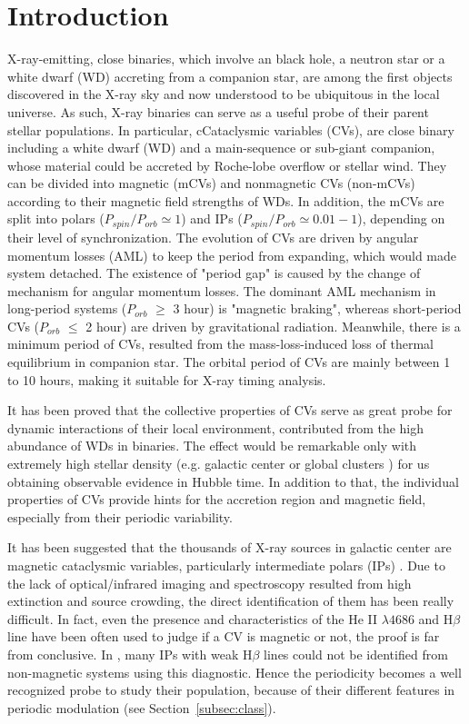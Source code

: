\documentclass[fleqn,usenatbib]{mnras}
\begin{document}
\section{Introduction} \label{sec:intro}
X-ray-emitting, close binaries, which involve an black hole, a neutron star or a white dwarf (WD) accreting from a companion star, are among the first objects discovered in the X-ray sky and now understood to be ubiquitous in the local universe. As such, X-ray binaries can serve as a useful probe of their parent stellar populations.
In particular, cCataclysmic variables (CVs), are close binary including a white dwarf (WD) and a main-sequence or sub-giant companion, whose material could be accreted by Roche-lobe overflow or stellar wind. 
They can be divided into magnetic (mCVs) and nonmagnetic CVs (non-mCVs) according to their magnetic field strengths of WDs. In addition, the mCVs are split into polars ($P_{spin}/P_{orb}\simeq 1$) and IPs ($P_{spin}/P_{orb}\simeq 0.01-1$), depending on their level of synchronization. 
The evolution of CVs are driven by angular momentum losses (AML) to keep the period from expanding, which would made system detached. The existence of  "period gap" is caused by the change of mechanism for angular momentum losses.  The dominant AML mechanism in long-period
systems ($P_{orb}$ $\geq$ 3 hour) is "magnetic braking", whereas short-period CVs ($P_{orb}$ $\leq$ 2 hour) are  driven by gravitational radiation. Meanwhile, there is a minimum period of CVs, resulted from the mass-loss-induced loss of thermal equilibrium in companion star. The orbital period of CVs are mainly between 1 to 10 hours, making it suitable for X-ray timing analysis. 

It has been proved that the collective properties of CVs serve as great probe for dynamic interactions of their local environment, contributed from the high abundance of WDs in binaries. The effect would be remarkable only with extremely high stellar density (e.g. galactic center or global clusters \citep{2019ApJ...876...59C}) for us obtaining observable evidence in Hubble time. 
In addition to that, the individual properties of CVs provide hints for the accretion region and magnetic field, especially from their periodic variability.

It has been suggested that the thousands of X-ray sources in galactic center are magnetic cataclysmic variables, particularly intermediate
polars (IPs) \citep{2009ApJS..181..110M,2018ApJS..235...26Z}. Due to the lack of optical/infrared imaging and spectroscopy resulted from high extinction and source crowding, the direct identification of them has been really difficult.
In fact, even the presence and characteristics of the He II $\lambda 4686$ and H$\beta$ line have been often used to judge if a CV is magnetic or not, the proof is far from conclusive. In \cite{1992PhDT.......119S}, many IPs with weak H$\beta$ lines could not be identified from non-magnetic systems using this diagnostic. 
Hence the periodicity becomes a well recognized probe to study their population, because of their different features in periodic modulation (see Section~\ref{subsec:class}).  
\end{document}
